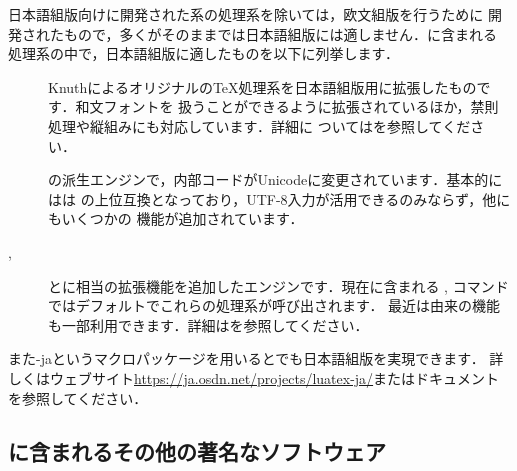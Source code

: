 \documentclass[uplatex,dvipdfmx,tombow]{jsarticle}
\begin{document}
%
\begin{janote}
日本語組版向けに開発された\pTeX 系の処理系を除いては，欧文組版を行うために
開発されたもので，多くがそのままでは日本語組版には適しません．\TL に含まれる
処理系の中で，日本語組版に適したものを以下に列挙します．
%
\begin{description}
\item[\pTeX]
Knuthによるオリジナルの\TeX 処理系を日本語組版用に拡張したものです．和文フォントを
扱うことができるように拡張されているほか，禁則処理や縦組みにも対応しています．詳細に
ついてはを参照してください．

\item[\upTeX]
\pTeX の派生エンジンで，内部コードがUnicodeに変更されています．基本的には\upTeX は
\pTeX の上位互換となっており，UTF-8入力が活用できるのみならず，他にもいくつかの
機能が追加されています．

\item[\epTeX, \eupTeX]
\pTeX と\upTeX に\eTeX 相当の拡張機能を追加したエンジンです．現在\TL に含まれる
, コマンドではデフォルトでこれらの処理系が呼び出されます．
最近は\pdfTeX 由来の機能も一部利用できます．詳細はを参照してください．
\end{description}
%
また\LuaTeX-jaというマクロパッケージを用いると\LuaTeX でも日本語組版を実現できます．
詳しくはウェブサイト\url{https://ja.osdn.net/projects/luatex-ja/}またはドキュメント
を参照してください．
\end{janote}

\subsection{\TL に含まれるその他の著名なソフトウェア}
\end{document}
